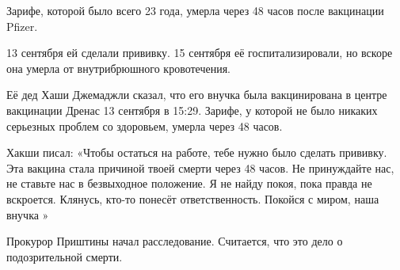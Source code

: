 Зарифе, которой было всего 23 года, умерла через 48 часов после вакцинации
Pfizer.

13 сентября ей сделали прививку. 15 сентября её госпитализировали, но вскоре она
умерла от внутрибрюшного кровотечения.

Её дед Хаши Джемаджли сказал, что его внучка была вакцинирована в центре
вакцинации Дренас 13 сентября в 15:29. Зарифе, у которой не было никаких
серьезных проблем со здоровьем, умерла через 48 часов.

Хакши писал: «Чтобы остаться на работе, тебе нужно было сделать прививку. Эта
вакцина стала причиной твоей смерти через 48 часов. Не принуждайте нас, не
ставьте нас в безвыходное положение. Я не найду покоя, пока правда не
вскроется. Клянусь, кто-то понесёт ответственность. Покойся с миром, наша внучка
»

Прокурор Приштины начал расследование. Считается, что это дело о подозрительной
смерти.
